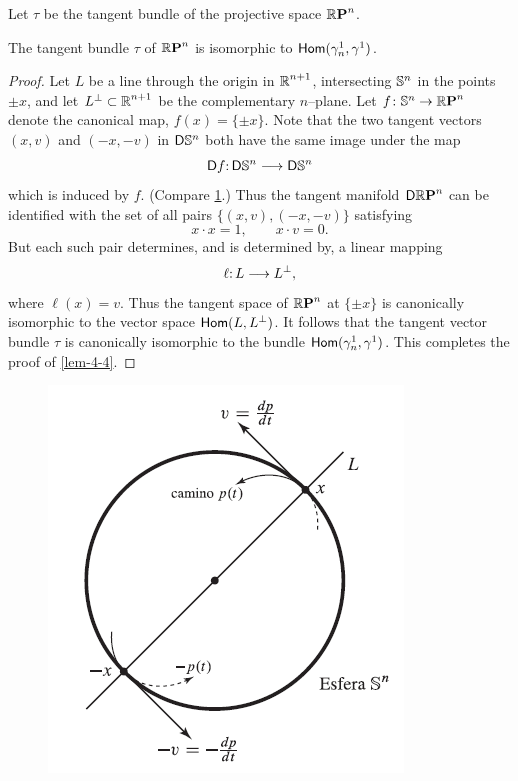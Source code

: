 \begin{example}\label{ex-4-4}
Let $\tau$ be the tangent bundle of the projective space $\boldsymbol{\mathbb{R}}\boldsymbol{\mathrm{P}}^{n}$.	
\end{example}

\begin{lemma}\label{lem-4-4}
The tangent bundle $\tau$ of $\boldsymbol{\mathbb{R}}\boldsymbol{\mathrm{P}}^{n}$ is isomorphic to
$\mathsf{Hom} (\gamma^1_n,\gamma^1)$.	
\end{lemma}
\begin{proof}
	Let $L$ be a line through the origin in $\boldsymbol{\mathbb{R}}^{n+1}$, intersecting $\mathbb{S}^{n}$
	in the points $\pm x$, and let $L^\perp\subset \boldsymbol{\mathbb{R}}^{n+1}$ be the complementary $n$--plane. Let
	$f\colon \mathbb{S}^{n}\to \boldsymbol{\mathbb{R}}\boldsymbol{\mathrm{P}}^{n}$ denote the canonical map, $f(x) =
	\{\pm x\}$. Note that the two 
	tangent vectors $(x, v)$ and $(-x, -v)$ in $\mathsf{D}\mathbb{S}^{n}$ both have the same image
	under the map
	\[\map{\mathsf{D}f}{\mathsf{D}\Sphere{n}}{\mathsf{D}\Sphere{n}}\]
	which is induced by $f$. (Compare \cref{fig5}.) Thus the tangent manifold
	$\mathsf{D}\boldsymbol{\mathbb{R}}\boldsymbol{\mathrm{P}}^{n}$ can be identified with the set of all pairs $\{(x, v), (-x, -
		v)\}$ 
		satisfying
	\[x\cdot x=1,\qquad x \cdot v=0. \]
	But each such pair determines, and is determined by, a linear mapping
	\[\map{\ell}{L}{L^\perp},\]
	where $\ell(x)=v$. Thus the tangent space of $\boldsymbol{\mathbb{R}}\boldsymbol{\mathrm{P}}^{n}$ at $\{\pm x\}$ is canonically isomorphic to the
		vector space $\mathsf{Hom} (L, L^\perp)$. It follows that the tangent vector bundle $\tau$ is canonically isomorphic to the bundle $\mathsf{Hom} (\gamma^1_n,\gamma^1)$. This completes
		the proof of \cref{lem-4-4}. 
\end{proof}
\begin{figure}[!htb]
	\centering\includegraphics[scale=.8]{fig5}
	\caption{}\label{fig5}
\end{figure}

